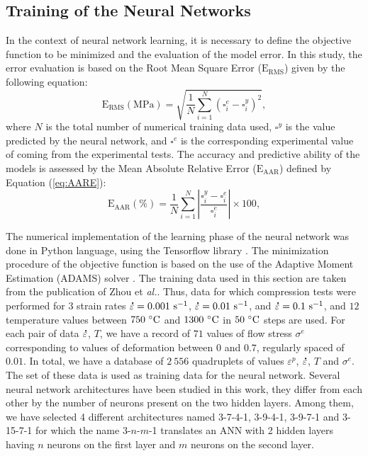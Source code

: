 \documentclass[algorithms,article,submit,pdftex,moreauthors]{Definitions/mdpi}
\makeatletter
\DeclareRobustCommand{\mdot}[1]{\accentset{\mbox{\bfseries .}}{#1}}
\DeclareRobustCommand{\eal}{et \emph{al.}\@\xspace}
\DeclareRobustCommand{\RMSE}{\text{E}_\text{RMS}}
\DeclareRobustCommand{\AARE}{\text{E}_\text{AAR}}
\DeclareRobustCommand{\ps}{\text{s}^{-1}}
\DeclareRobustCommand{\MPa}{\text{MPa}}
\makeatother
\begin{document}
\subsection{Training of the Neural Networks}\label{sec:ANN-traning}

In the context of neural network learning, it is necessary to define the objective function to be minimized and the evaluation of the model error. In this study, the error evaluation is based on the Root Mean Square Error ($\RMSE$) given by the following equation:
\begin{equation}
\RMSE (\MPa) = \sqrt{\frac{1}{N} \sum_{i=1}^{N} \left(\square_i^e - \square_i^y\right)^2}, \label{eq:RMSE}
\end{equation}
where $N$ is the total number of numerical training data used, $\square^y$ is the value predicted by the neural network, and $\square^e$ is the corresponding experimental value of coming from the experimental tests.
The accuracy and predictive ability of the models is assessed by the Mean Absolute Relative Error ($\AARE$) defined by Equation (\ref{eq:AARE}):
\begin{equation}
\AARE(\%) = \frac{1}{N} \sum_{i=1}^{N}{\left|\frac{\square_i^y -\square_i^e}{\square_i^e}\right|} \times 100, \label{eq:AARE}
\end{equation}

The numerical implementation of the learning phase of the neural network was done in Python language, using the Tensorflow library \cite{Abadi-2016}.
The minimization procedure of the objective function is based on the use of the Adaptive Moment Estimation (ADAMS) solver \cite{Kingma-2015}.
The training data used in this section are taken from the publication of Zhou \eal \cite{Zhou-2019}.
Thus, data for which compression tests were performed for $3$ strain rates $\mdot\varepsilon=0.001~\ps$, $\mdot\varepsilon=0.01~\ps$, and $\mdot\varepsilon=0.1~\ps$, and $12$ temperature values between $750~\celsius$ and $1300~\celsius$ in $50~\celsius$ steps are used.
For each pair of data $\mdot\varepsilon$, $T$, we have a record of $71$ values of flow stress $\sigma^e$ corresponding to values of deformation between $0$ and $0.7$, regularly spaced of $0.01$.
In total, we have a database of $2~556$ quadruplets of values $\varepsilon^p$, $\mdot\varepsilon$, $T$ and $\sigma^e$.
The set of these data is used as training data for the neural network.
Several neural network architectures have been studied in this work, they differ from each other by the number of neurons present on the two hidden layers.
Among them, we have selected 4 different architectures named 3-7-4-1, 3-9-4-1, 3-9-7-1 and 3-15-7-1 for which the name 3-$n$-$m$-1 translates an ANN with 2 hidden layers having $n$ neurons on the first layer and $m$ neurons on the second layer.
\end{document}
